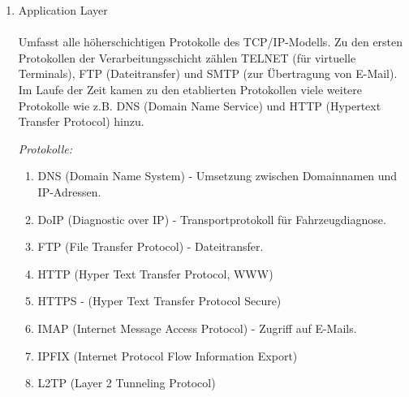 \documentclass[11pt]{article}
\begin{document}
    \begin{enumerate}

        \item{Application Layer}\\\\
        Umfasst alle höherschichtigen Protokolle des TCP/IP-Modells.
        Zu den ersten Protokollen der Verarbeitungsschicht zählen TELNET (für virtuelle Terminals),
        FTP (Dateitransfer) und SMTP (zur Übertragung von E-Mail).
        Im Laufe der Zeit kamen zu den etablierten Protokollen viele weitere Protokolle wie z.B.
        DNS (Domain Name Service) und HTTP (Hypertext Transfer Protocol) hinzu.\\

        \begin{addmargin}[1em]{1em}

            \emph{Protokolle:}\\
            \begin{enumerate}

                \item DNS (Domain Name System) - Umsetzung zwischen Domainnamen und IP-Adressen.\\

                \item DoIP (Diagnostic over IP) - Transportprotokoll für Fahrzeugdiagnose.\\

                \item FTP (File Transfer Protocol) - Dateitransfer.\\

                \item HTTP (Hyper Text Transfer Protocol, WWW)\\

                \item HTTPS - (Hyper Text Transfer Protocol Secure)\\

                \item IMAP (Internet Message Access Protocol) - Zugriff auf E-Mails.\\

                \item IPFIX (Internet Protocol Flow Information Export)\\

                \item L2TP (Layer 2 Tunneling Protocol)\\


\end{enumerate}
\end{addmargin}
\end{enumerate}
\end{document}
